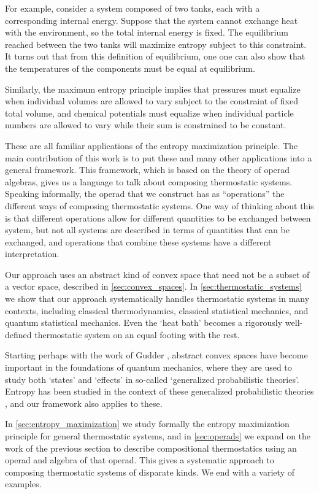 \documentclass[12pt, reqno]{amsart}
\begin{document}
For example, consider a system composed of two tanks, each with a corresponding internal energy. Suppose that the system cannot exchange heat with the environment, so the total internal energy is fixed. The equilibrium reached between the two tanks will maximize entropy subject to this constraint. It turns out that from this definition of equilibrium, one one can also show that the temperatures of the components must be equal at equilibrium.

Similarly, the maximum entropy principle implies that pressures must equalize when individual volumes are allowed to vary subject to the constraint of fixed total volume, and chemical potentials must equalize when individual particle numbers are allowed to vary while their sum is constrained to be constant.

These are all familiar applications of the entropy maximization principle. The main contribution of this work is to put these and many other applications into a general framework. This framework, which is based on the theory of operad algebras, gives us a language to talk about composing thermostatic systems. Speaking informally, the operad that we construct has as ``operations'' the different ways of composing thermostatic systems. One way of thinking about this is that different operations allow for different quantities to be exchanged between system, but not all systems are described in terms of quantities that can be exchanged, and operations that combine these systems have a different interpretation. 

Our approach uses an abstract kind of convex space that need not be a subset of a vector space, described in \cref{sec:convex_spaces}. In \cref{sec:thermostatic_systems} we show that our approach systematically handles thermostatic systems in many contexts, including classical thermodynamics, classical statistical mechanics, and quantum statistical mechanics. Even the `heat bath' becomes a rigorously well-defined thermostatic system on an equal footing with the rest.

Starting perhaps with the work of Gudder \cite{Gudder1977}, abstract convex spaces have become important in the foundations of quantum mechanics, where they are used to study both `states' and `effects' \cite{Jacobs} in so-called `generalized probabilistic theories'. Entropy has been studied in the context of these generalized probabilistic theories \cite{Barnum_et_al, Krumm_et_al, ShortWehner}, and our framework also applies to these.

In \cref{sec:entropy_maximization} we study formally the entropy maximization principle for general thermostatic systems, and in \cref{sec:operads} we expand on the work of the previous section to describe compositional thermostatics using an operad and algebra of that operad. This gives a systematic approach to composing thermostatic systems of disparate kinds. We end with a variety of examples.
\fi
\end{document}

